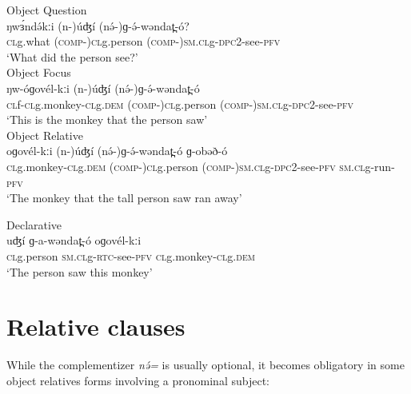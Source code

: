 \ea
\ea	Object Question\\
\gll	ŋwɜ́ndə́kːi	(n-)úʤí	(nə́-)ɡ-ə́-wəndat̪-ó?\\                        
	\textsc{cl}g.what	(\textsc{comp-})\textsc{cl}g.person	(\textsc{comp-})\textsc{sm.cl}g-\textsc{dpc2}-see-\textsc{pfv} \\  
\trans		‘What did the person see?’\\
\ex	Object Focus\\
\gll ŋw-óɡovél-kːi	(n-)úʤí (nə́-)ɡ-ə́-wəndat̪-ó \\
\textsc{cl}f-\textsc{cl}g.monkey-\textsc{cl}g.\textsc{dem}	(\textsc{comp-})\textsc{cl}g.person (\textsc{comp-})\textsc{sm.cl}g-\textsc{dpc2}-see-\textsc{pfv}   \\
\trans		‘This is the monkey that the person saw’\\
\ex	Object Relative\\
\gll oɡovél-kːi	(n-)úʤí		(nə́-)ɡ-ə́-wəndat̪-ó	ɡ-obəð-ó	\\
\textsc{cl}g.monkey-\textsc{cl}g.\textsc{dem}	(\textsc{comp-})\textsc{cl}g.person (\textsc{comp-})\textsc{sm.cl}g-\textsc{dpc2}-see-\textsc{pfv}	\textsc{sm.cl}g-run-\textsc{pfv}\\
\trans		‘The monkey that the tall person saw ran away’\\
\z
\z

\ea	 	Declarative\\
\gll	uʤí	ɡ-a-wəndat̪-ó	oɡovél-kːi    \\
 \textsc{cl}g.person	\textsc{sm.cl}g-\textsc{rtc}-see-\textsc{pfv}	\textsc{cl}g.monkey-\textsc{cl}g.\textsc{dem}\\
\trans	‘The person saw this monkey’\\
\z

\section{Relative clauses}\label{relativeclause}

While the complementizer \textit{nə́=} is usually optional, it becomes obligatory in some object relatives forms involving a pronominal subject:


